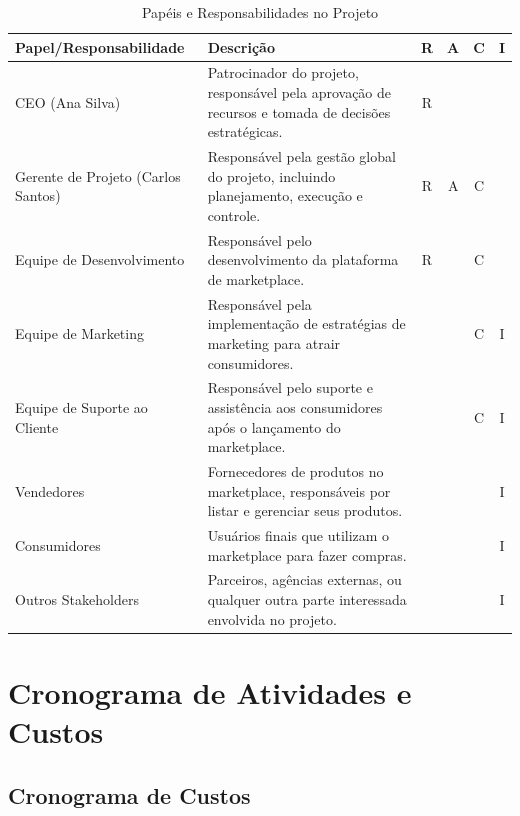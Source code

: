 \documentclass[
	12pt,				%
	openright,			%
	twoside,			%
	a4paper,			%
	english,			%
	brazil				%
	]{abntex2}
\begin{document}
\begin{table}[htb]
    \caption{Papéis e Responsabilidades no Projeto}
    \small %
    \begin{adjustbox}{center}
        \begin{tabular}{|p{3cm}|p{5cm}|c|c|c|c|}
            \hline
            \textbf{Papel/Responsabilidade} & \textbf{Descrição} & \textbf{R} & \textbf{A} & \textbf{C} & \textbf{I} \\
            \hline
            CEO (Ana Silva) & Patrocinador do projeto, responsável pela aprovação de recursos e tomada de decisões estratégicas. & R & & & \\
            Gerente de Projeto (Carlos Santos) & Responsável pela gestão global do projeto, incluindo planejamento, execução e controle. & R & A & C & \\
            Equipe de Desenvolvimento & Responsável pelo desenvolvimento da plataforma de marketplace. & R & & C & \\
            Equipe de Marketing & Responsável pela implementação de estratégias de marketing para atrair consumidores. & & & C & I \\
            Equipe de Suporte ao Cliente & Responsável pelo suporte e assistência aos consumidores após o lançamento do marketplace. & & & C & I \\
            Vendedores & Fornecedores de produtos no marketplace, responsáveis por listar e gerenciar seus produtos. & & & & I \\
            Consumidores & Usuários finais que utilizam o marketplace para fazer compras. & & & & I \\
            Outros Stakeholders & Parceiros, agências externas, ou qualquer outra parte interessada envolvida no projeto. & & & & I \\
            \hline
        \end{tabular}
    \end{adjustbox}
\end{table}

\chapter{Cronograma de Atividades e Custos}\label{cap_cronograma_de_atividades_e_custos}

\section{Cronograma de Custos}
\end{document}
